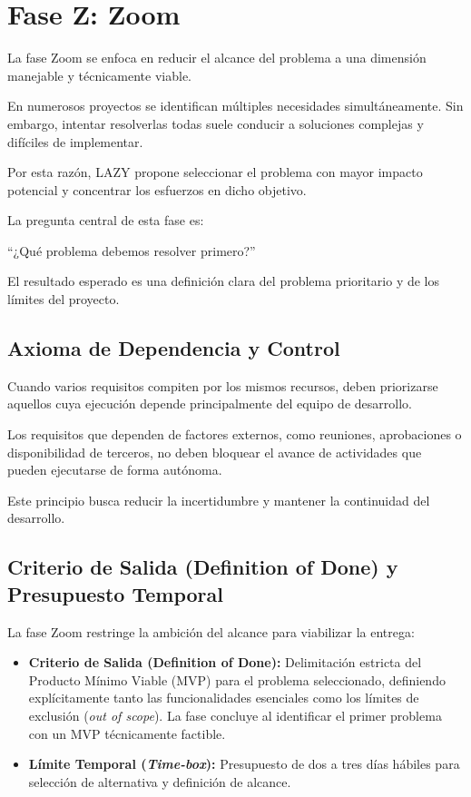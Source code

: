\documentclass[14pt,a4paper,oneside]{extbook}
\begin{document}
\section{Fase Z: Zoom}

La fase Zoom se enfoca en reducir el alcance del problema a una dimensión manejable y técnicamente viable.

En numerosos proyectos se identifican múltiples necesidades simultáneamente. Sin embargo, intentar resolverlas todas suele conducir a soluciones complejas y difíciles de implementar.

Por esta razón, LAZY propone seleccionar el problema con mayor impacto potencial y concentrar los esfuerzos en dicho objetivo.

La pregunta central de esta fase es:

\begin{keyquestion}
\enquote{¿Qué problema debemos resolver primero?}
\end{keyquestion}

El resultado esperado es una definición clara del problema prioritario y de los límites del proyecto.

\subsection{Axioma de Dependencia y Control}

Cuando varios requisitos compiten por los mismos recursos, deben priorizarse aquellos cuya ejecución depende principalmente del equipo de desarrollo.

Los requisitos que dependen de factores externos, como reuniones, aprobaciones o disponibilidad de terceros, no deben bloquear el avance de actividades que pueden ejecutarse de forma autónoma.

Este principio busca reducir la incertidumbre y mantener la continuidad del desarrollo.

\subsection{Criterio de Salida (Definition of Done) y Presupuesto Temporal}

La fase Zoom restringe la ambición del alcance para viabilizar la entrega:

\begin{itemize}
\item \textbf{Criterio de Salida (Definition of Done):} Delimitación estricta del Producto Mínimo Viable (MVP) para el problema seleccionado, definiendo explícitamente tanto las funcionalidades esenciales como los límites de exclusión (\textit{out of scope}). La fase concluye al identificar el primer problema con un MVP técnicamente factible.
\item \textbf{Límite Temporal (\textit{Time-box}):} Presupuesto de dos a tres días hábiles para selección de alternativa y definición de alcance.
\end{itemize}
\end{document}
